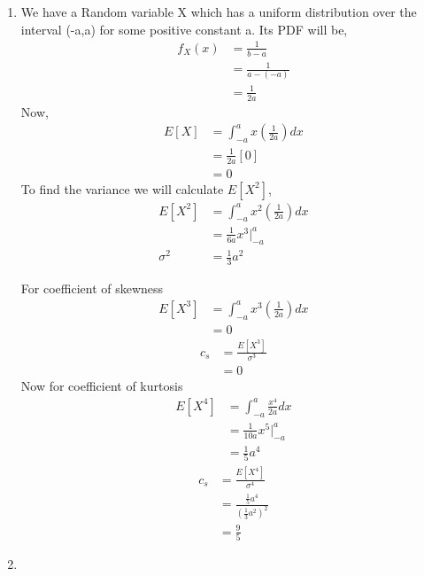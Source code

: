 \documentclass{article}
\begin{document}
\begin{enumerate}
\newpage
\item 
We have a Random variable X which has a uniform distribution over the interval (-a,a) for some positive constant a. Its PDF will be, 
\begin{align*}
f_{X}(x)&=\frac{1}{b-a}\\
&=\frac{1}{a-(-a)}\\
&=\frac{1}{2a}
\end{align*}
Now,
\begin{align*}
E[X]&=\int_{-a}^{a} x \left( \frac{1}{2a} \right) dx\\
&=\frac{1}{2a}[0]\\
&=0
\end{align*}
To find the variance we will calculate $E[X^2]$,
\begin{align*}
E[X^2]&=\int_{-a}^{a} x^2 \left( \frac{1}{2a} \right) dx\\
&=\frac{1}{6a}x^3\Big|_{-a}^{a} \\
\sigma^2 &=\frac{1}{3}a^2
\end{align*}



 For coefficient of skewness
\begin{align*}
E[X^3] &=\int_{-a}^{a} x^3 \left( \frac{1}{2a} \right) dx \\
&=0
\end{align*}
\begin{align*}
c_{s}&=\frac{E[X^3]}{\sigma^3}\\
&=0
\end{align*}
 Now for coefficient of kurtosis
\begin{align*}
E[X^4]&=\int_{-a}^{a}\frac{x^4}{2a}dx\\
&=\frac{1}{10a}x^5\Big|_{-a}^{a} \\
&=\frac{1}{5}a^4
\end{align*}
\begin{align*}
c_{s}&=\frac{E[X^4]}{\sigma^4}\\
&=\frac{\frac{1}{5}a^4}{ \left( \frac{1}{3}a^2 \right)^2 }\\
&=\frac{9}{5}
\end{align*}

\vspace{2mm} 
\newpage
\item
     

\end{enumerate}
\end{document}
